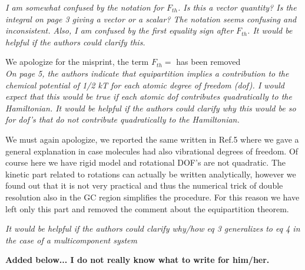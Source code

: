 \documentclass[12pt]{article}
\newcommand{\recheck}[1]{{\color{red} #1}}
\begin{document}
{\it  I am somewhat confused by the notation for $F_{th}$. Is this a vector quantity? Is the integral on page 3 giving a vector or a scalar? The notation seems confusing and inconsistent. Also, I am confused by the first equality sign after $F_{th}$. It would be helpful if the authors could clarify this.}

We apologize for the misprint, the term $F_{th}=$ has been removed\\


{\it On page 5, the authors indicate that equipartition implies a
  contribution to the chemical potential of 1/2 kT for each atomic
  degree of freedom (dof). I would expect that this would be true if
  each atomic dof contributes quadratically to the Hamiltonian. It
  would be helpful if the authors could clarify why this would be so
  for dof's that do not contribute quadratically to the Hamiltonian.}

We must again apologize, we reported the same written in Ref.5 where
we gave a general explanation in case molecules had also vibrational
degrees of freedom. Of course here we have rigid model and rotational
DOF's are not quadratic. The kinetic part related to rotations can
actually be written analytically, however we found out that it is not
very practical and thus the numerical trick of double resolution also
in the GC region simplifies the procedure.  For this reason we have
left only this part and removed the comment about the equipartition
theorem.

{\it  It would be helpful if the authors could clarify why/how eq 3 generalizes to eq 4 in the case of a multicomponent system}

\recheck{\bf Added below... I do not really know what to write for him/her.}
\end{document}
